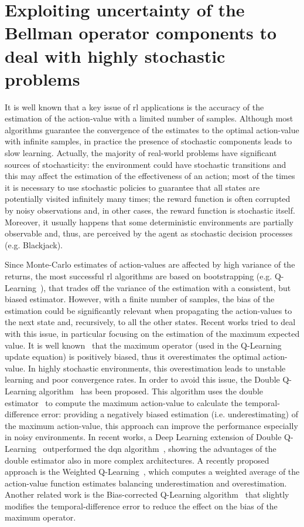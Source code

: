 \chapter{Exploiting uncertainty of the Bellman operator components to deal with highly stochastic problems}
It is well known that a key issue of \gls{rl} applications is the accuracy of the estimation of the action-value with a limited number of samples. Although most algorithms guarantee the convergence of the estimates to the optimal action-value with infinite samples, in practice the presence of stochastic components leads to slow learning. Actually, the majority of real-world problems have significant sources of stochasticity: the environment could have stochastic transitions and this may affect the estimation of the effectiveness of an action; most of the times it is necessary to use stochastic policies to guarantee that all states are potentially visited infinitely many times; the reward function is often corrupted by noisy observations and, in other cases, the reward function is stochastic itself. Moreover, it usually happens that some deterministic environments are partially observable and, thus, are perceived by the agent as stochastic decision processes (e.g. Blackjack).

Since Monte-Carlo estimates of action-values are affected by high variance of the returns, the most successful \gls{rl} algorithms are based on bootstrapping (e.g. Q-Learning~\cite{watkins1989learning}), that trades off the variance of the estimation with a consistent, but biased estimator. However, with a finite number of samples, the bias of the estimation could be significantly relevant when propagating the action-values to the next state and, recursively, to all the other states. Recent works tried to deal with this issue, in particular focusing on the estimation of the maximum expected value. 
It is well known~\cite{smith2006optimizer, van2004rational} that the maximum operator (used in the Q-Learning update equation) is positively biased, thus it overestimates the optimal action-value. In highly stochastic environments, this overestimation leads to unstable learning and poor convergence rates. In order to avoid this issue, the Double Q-Learning algorithm~\cite{van2010double} has been proposed. This algorithm uses the double estimator~\cite{van2013estimating} to compute the maximum action-value to calculate the temporal-difference error: providing a negatively biased estimation (i.e. underestimating) of the maximum action-value, this approach can improve the performance especially in noisy environments. In recent works, a Deep Learning extension of Double Q-Learning~\cite{van2016deep} outperformed the \gls{dqn} algorithm~\cite{mnih2015human}, showing the advantages of the double estimator also in more complex architectures.
A recently proposed approach is the Weighted Q-Learning~\cite{deramo2016estimating}, which computes a weighted average of the action-value function estimates balancing underestimation and overestimation. Another related work is the Bias-corrected Q-Learning algorithm~\cite{lee2013bias} that slightly modifies the temporal-difference error to reduce the effect on the bias of the maximum operator.

